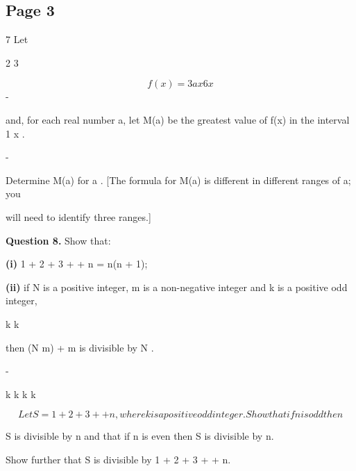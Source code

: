 \documentclass[12pt]{article}
\begin{document}
\subsection*{Page 3}
\begin{flushleft}
7 Let\par
2 3\par
\[f(x) = 3ax 6x\]
-\par
and, for each real number a, let M(a) be the greatest value of f(x) in the interval 1 \geq x .\par
-\par
Determine M(a) for a . [The formula for M(a) is different in different ranges of a; you\par
will need to identify three ranges.]\par
\bigskip\textbf{Question 8.} Show that:\par
\textbf{(i)} 1 + 2 + 3 + + n = n(n + 1);\par
\cdots\par
\textbf{(ii)} if N is a positive integer, m is a non-negative integer and k is a positive odd integer,\par
k k\par
then (N m) + m is divisible by N .\par
-\par
k k k k\par
\[Let S = 1 + 2 + 3 + + n , where k is a positive odd integer. Show that if n is odd then\]
\par
S is divisible by n and that if n is even then S is divisible by n.\par
Show further that S is divisible by 1 + 2 + 3 + + n.\par
\cdots\par
\end{flushleft}
\end{document}
